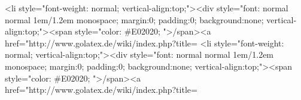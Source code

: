<li style="font-weight: normal; vertical-align:top;"><div style="font: normal normal 1em/1.2em monospace; margin:0; padding:0; background:none; vertical-align:top;"><span style="color: #E02020; ">\</span><a href="http://www.golatex.de/wiki/index.php?title=%
<li style="font-weight: normal; vertical-align:top;"><div style="font: normal normal 1em/1.2em monospace; margin:0; padding:0; background:none; vertical-align:top;"><span style="color: #E02020; ">\</span><a href="http://www.golatex.de/wiki/index.php?title=%
